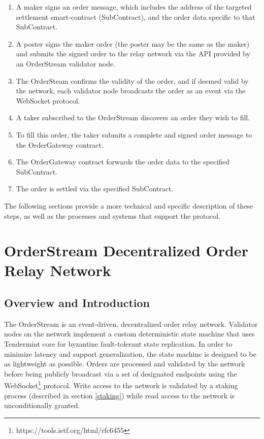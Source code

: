 \documentclass[9pt]{article}
\begin{document}
\begin {enumerate}
\item A maker signs an order message, which includes the address of the targeted settlement smart-contract (SubContract), and the order data specific to that SubContract.
\item A poster signs the maker order (the poster may be the same as the maker) and submits the signed order to the relay network via the API provided by an OrderStream validator node.
\item The OrderSteam confirms the validity of the order, and if deemed valid by the network, each validator node broadcasts the order as an event via the WebSocket protocol.
\item A taker subscribed to the OrderStream discovers an order they wish to fill.
\item To fill this order, the taker submits a complete and signed order message to the OrderGateway contract.
\item The OrderGateway contract forwards the order data to the specified SubContract.
\item The order is settled via the specified SubContract.
\end{enumerate}

\noindent The following sections provide a more technical and specific description of these steps, as well as the processes and systems that support the protocol.

\clearpage
\pagebreak


\section{OrderStream Decentralized Order Relay Network}\label{orderstream}

\subsection{Overview and Introduction}\label{orderstream introduction}

\noindent The OrderStream is an event-driven, decentralized order relay network. Validator nodes on the network implement a custom deterministic state machine that uses Tendermint core for byzantine fault-tolerant state replication\cite{tendermint}. In order to minimize latency and support generalization, the state machine is designed to be as lightweight as possible. Orders are processed and validated by the network before being publicly broadcast via a set of designated endpoints using the WebSocket\footnote{https://tools.ietf.org/html/rfc6455} protocol. Write access to the network is validated by a staking process (described in section \ref{staking}) while read access to the network is unconditionally granted. \\
\end{document}

